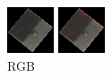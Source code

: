 \documentclass[a4paper,12pt]{article}  %
\begin{document}
\begin{figure}[H]
    \centering
    \begin{minipage}{0.24\textwidth}
        \centering
        \includegraphics[width=\linewidth]{spektralne/rgb_budynek7_maska.png}
        \caption*{RGB}
    \end{minipage}
    \begin{minipage}{0.24\textwidth}
        \centering
        \includegraphics[width=\linewidth]{spektralne/irgb_budynek7_maska.png}

\end{minipage}
\end{figure}
\end{document}
